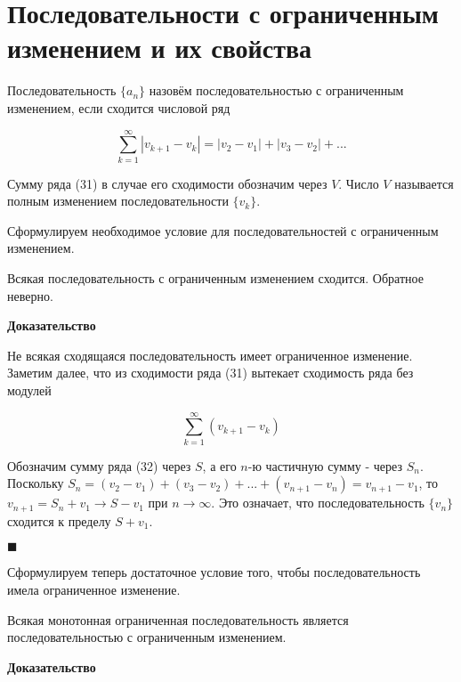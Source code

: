 \section{Последовательности с ограниченным изменением и их свойства}

\begin{definition}
	Последовательность $\{a_n\}$ назовём последовательностью с ограниченным изменением, если сходится числовой ряд
	
	\begin{equation}
		\displaystyle\sum_{k = 1}^\infty |v_{k + 1} - v_k| = |v_2 - v_1| + |v_3 - v_2| + ...
	\end{equation}
	
	Сумму ряда (31) в случае его сходимости обозначим через $V$. Число $V$ называется полным изменением последовательности $\{v_k\}$.
\end{definition}

Сформулируем необходимое условие для последовательностей с ограниченным изменением.

\begin{statm}
	Всякая последовательность с ограниченным изменением сходится. Обратное неверно.
\end{statm}
\textbf{Доказательство}

Не всякая сходящаяся последовательность имеет ограниченное изменение. Заметим далее, что из сходимости ряда (31) вытекает сходимость ряда без модулей

\begin{equation*}
	\displaystyle\sum_{k = 1}^\infty (v_{k + 1} - v_k)
\end{equation*}

Обозначим сумму ряда (32) через $S$, а его $n$-ю частичную сумму - через $S_n$. Поскольку $S_n = (v_2 - v_1) + (v_3 - v_2) + ... + (v_{n + 1} - v_n) = v_{n + 1} - v_1$, то $v_{n + 1} = S_n + v_1 \rightarrow S - v_1$ при $n \rightarrow \infty$. Это означает, что последовательность $\{v_n\}$ сходится к пределу $S + v_1$.

\begin{flushright}
	$\blacksquare$
\end{flushright}

Сформулируем теперь достаточное условие того, чтобы последовательность имела ограниченное изменение.

\begin{statm}
	Всякая монотонная ограниченная последовательность является последовательностью с ограниченным изменением.
\end{statm}
\textbf{Доказательство}

